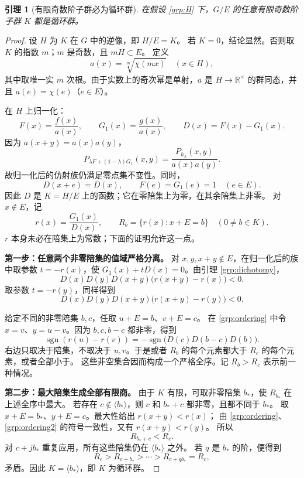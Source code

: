 \documentclass[11pt,a4paper,oneside,openany]{book}
\theoremstyle{lecture}
\newtheorem{lemma}[theorem]{引理}
\newcommand{\R}{\mathbb R}
\newcommand{\sgn}{\operatorname{sgn}}
\numberwithin{equation}{section}
\begin{document}
\begin{lemma}[有限奇数阶子群必为循环群]\label{grp:finiteodd}
在假设 \eqref{grp:H} 下，$G/E$ 的任意有限奇数阶子群 $K$ 都是循环群。
\end{lemma}

\begin{proof}
设 $H$ 为 $K$ 在 $G$ 中的逆像，即 $H/E=K$。
若 $K=0$，结论显然。否则取 $K$ 的指数 $m$；$m$ 是奇数，且 $mH\subset E$。
定义
\[
 a(x)=\sqrt[m]{\chi(mx)}\quad(x\in H),
\]
其中取唯一实 $m$ 次根。由于实数上的奇次幂是单射，$a$ 是
$H\to\R^\times$ 的群同态，并且 $a(e)=\chi(e)$（$e\in E$）。

在 $H$ 上归一化：
\[
 F(x)=\frac{f(x)}{a(x)},\qquad
 G_1(x)=\frac{g(x)}{a(x)},\qquad
 D(x)=F(x)-G_1(x).
\]
因为 $a(x+y)=a(x)a(y)$，
\[
 P_{\lambda F+(1-\lambda)G_1}(x,y)
 =\frac{P_{h_\lambda}(x,y)}{a(x)a(y)}.
\]
故归一化后的仿射族仍满足零点集不变性。同时，
\[
 D(x+e)=D(x),\qquad F(e)=G_1(e)=1 \quad(e\in E).
\]
因此 $D$ 是 $K=H/E$ 上的函数；它在零陪集上为零，在其余陪集上非零。
对 $x\notin E$，记
\[
 r(x)=\frac{G_1(x)}{D(x)},\qquad
 R_b=\{r(x):x+E=b\}\quad(0\ne b\in K).
\]
$r$ 本身未必在陪集上为常数；下面的证明允许这一点。

\textbf{第一步：任意两个非零陪集的值域严格分离。}
对 $x,y,x+y\notin E$，在归一化后的族中取参数
$t=-r(x)$，使 $G_1(x)+tD(x)=0$。由引理 \ref{grp:dichotomy}，
\begin{equation}\label{grp:ordering}
 D(x)D(y)D(x+y)\bigl(r(x+y)-r(x)\bigr)<0.
\end{equation}
取参数 $t=-r(y)$，同样得到
\begin{equation}\label{grp:ordering2}
 D(x)D(y)D(x+y)\bigl(r(x+y)-r(y)\bigr)<0.
\end{equation}

给定不同的非零陪集 $b,c$，任取 $u+E=b$、$v+E=c$。
在 \eqref{grp:ordering} 中令 $x=v$、$y=u-v$。因为 $b,c,b-c$ 都非零，得到
\[
 \sgn(r(u)-r(v))
 =-\sgn\bigl(D(c)D(b-c)D(b)\bigr).
\]
右边只取决于陪集，不取决于 $u,v$。于是或者 $R_b$ 的每个元素都大于
$R_c$ 的每个元素，或者全部小于。
这些非空集合因而构成一个严格全序。记 $R_b>R_c$ 表示前一种情况。

\textbf{第二步：最大陪集生成全部有限商。}
由于 $K$ 有限，可取非零陪集 $b_*$，使 $R_{b_*}$ 在上述全序中最大。
若存在 $c\notin\langle b_*\rangle$，则 $c$ 和 $b_*+c$ 都非零，且都不同于 $b_*$。
取 $x+E=b_*$、$y+E=c$。最大性给出 $r(x+y)<r(x)$；
由 \eqref{grp:ordering}、\eqref{grp:ordering2} 的符号一致性，又有 $r(x+y)<r(y)$。
所以
\[
 R_{b_*+c}<R_c.
\]
对 $c+jb_*$ 重复应用，所有这些陪集仍在 $\langle b_*\rangle$ 之外。
若 $q$ 是 $b_*$ 的阶，便得到
\[
 R_c>R_{c+b_*}>\cdots>R_{c+qb_*}=R_c,
\]
矛盾。因此 $K=\langle b_*\rangle$，即 $K$ 为循环群。
\end{proof}
\end{document}
